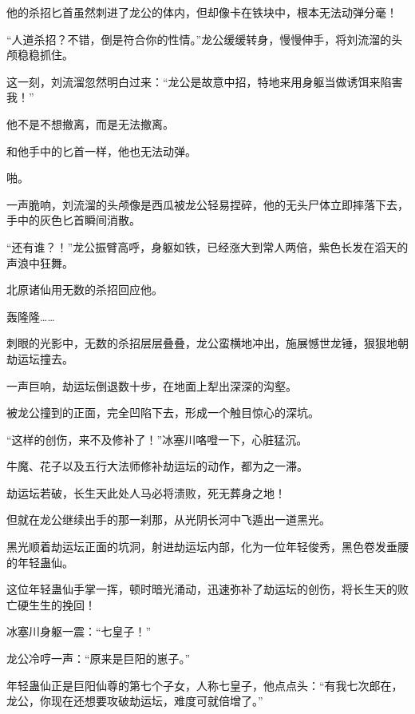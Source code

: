 \begin{this_body}
他的杀招匕首虽然刺进了龙公的体内，但却像卡在铁块中，根本无法动弹分毫！

“人道杀招？不错，倒是符合你的性情。”龙公缓缓转身，慢慢伸手，将刘流溜的头颅稳稳抓住。

这一刻，刘流溜忽然明白过来：“龙公是故意中招，特地来用身躯当做诱饵来陷害我！”

他不是不想撤离，而是无法撤离。

和他手中的匕首一样，他也无法动弹。

啪。

一声脆响，刘流溜的头颅像是西瓜被龙公轻易捏碎，他的无头尸体立即摔落下去，手中的灰色匕首瞬间消散。

“还有谁？！”龙公振臂高呼，身躯如铁，已经涨大到常人两倍，紫色长发在滔天的声浪中狂舞。

北原诸仙用无数的杀招回应他。

轰隆隆……

刺眼的光影中，无数的杀招层层叠叠，龙公蛮横地冲出，施展憾世龙锤，狠狠地朝劫运坛撞去。

一声巨响，劫运坛倒退数十步，在地面上犁出深深的沟壑。

被龙公撞到的正面，完全凹陷下去，形成一个触目惊心的深坑。

“这样的创伤，来不及修补了！”冰塞川咯噔一下，心脏猛沉。

牛魔、花子以及五行大法师修补劫运坛的动作，都为之一滞。

劫运坛若破，长生天此处人马必将溃败，死无葬身之地！

但就在龙公继续出手的那一刹那，从光阴长河中飞遁出一道黑光。

黑光顺着劫运坛正面的坑洞，射进劫运坛内部，化为一位年轻俊秀，黑色卷发垂腰的年轻蛊仙。

这位年轻蛊仙手掌一挥，顿时暗光涌动，迅速弥补了劫运坛的创伤，将长生天的败亡硬生生的挽回！

冰塞川身躯一震：“七皇子！”

龙公冷哼一声：“原来是巨阳的崽子。”

年轻蛊仙正是巨阳仙尊的第七个子女，人称七皇子，他点点头：“有我七次郎在，龙公，你现在还想要攻破劫运坛，难度可就倍增了。”

\end{this_body}

